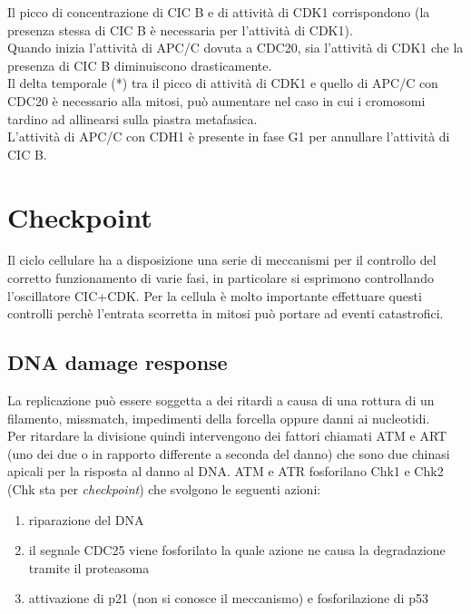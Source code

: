                 Il picco di concentrazione di CIC B e di attività di CDK1 corrispondono (la presenza stessa di CIC B è necessaria per l'attività di CDK1). \\
                Quando inizia l'attività di APC/C dovuta a CDC20, sia l'attività di CDK1 che la presenza di CIC B diminuiscono drasticamente.\\
                Il delta temporale (*) tra il picco di attività di CDK1 e quello di APC/C con CDC20 è necessario alla mitosi, può aumentare nel caso in cui i cromosomi tardino ad allinearsi sulla piastra metafasica.\\
                L'attività di APC/C con CDH1 è presente in fase G1 per annullare l'attività di CIC B.
    
\section{Checkpoint}
    Il ciclo cellulare ha a disposizione una serie di meccanismi per il controllo del corretto funzionamento di varie fasi, in particolare si esprimono controllando l'oscillatore CIC+CDK. 
    Per la cellula è molto importante effettuare questi controlli perchè l'entrata scorretta in mitosi può portare ad eventi catastrofici. 
    
    \subsection{DNA damage response}
        La replicazione può essere soggetta a dei ritardi a causa di una rottura di un filamento, missmatch, impedimenti della forcella oppure danni ai nucleotidi.\\
        Per ritardare la divisione quindi intervengono dei fattori chiamati ATM e ART (uno dei due o in rapporto differente a seconda del danno) che sono due chinasi apicali per la risposta al danno al DNA.
        ATM e ATR fosforilano Chk1 e Chk2 (Chk sta per \textit{checkpoint}) che svolgono le seguenti azioni:
        \begin{enumerate}
            \item riparazione del DNA
            \item il segnale CDC25 viene fosforilato la quale azione ne causa la degradazione tramite il proteasoma
            \item attivazione di p21 (non si conosce il meccanismo) e fosforilazione di p53
        \end{enumerate}
        
